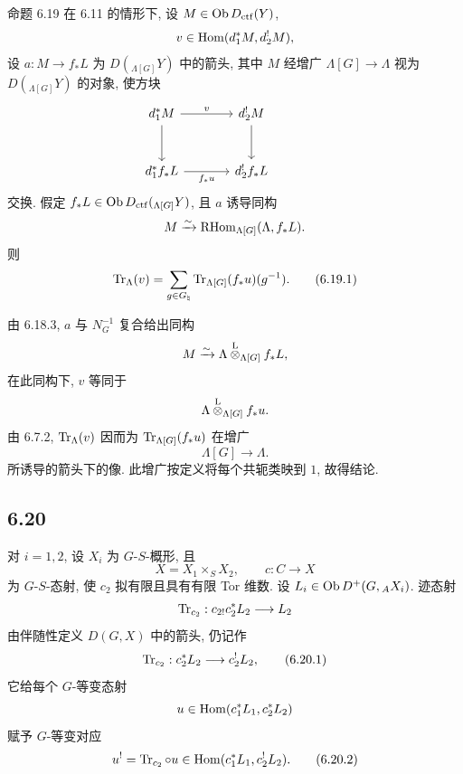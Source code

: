 \begin{statement}{命题 6.19}
在 6.11 的情形下, 设 $M\in\operatorname{Ob} D_{\mathrm{ctf}}(Y)$,
\[
v\in\operatorname{Hom}(d_1^*M,d_2^!M),
\]
设 $a:M\to f_*L$ 为 $D({}_{\Lambda[G]}Y)$ 中的箭头, 其中 $M$ 经增广 $\Lambda[G]\to\Lambda$ 视为 $D({}_{\Lambda[G]}Y)$ 的对象, 使方块
\[
\begin{tikzcd}[column sep=large,row sep=large]
d_1^*M \arrow[r,"v"] \arrow[d] & d_2^!M \arrow[d] & {}\\
d_1^*f_*L \arrow[r,"f_*u"'] & d_2^!f_*L
\end{tikzcd}
\]
交换. 假定 $f_*L\in\operatorname{Ob} D_{\mathrm{ctf}}({}_{\Lambda[G]}Y)$, 且 $a$ 诱导同构
\[
M\xrightarrow{\sim}\mathrm{RHom}_{\Lambda[G]}(\Lambda,f_*L).
\]
则
\begin{equation}
\operatorname{Tr}_{\Lambda}(v)=
\sum_{g\in G_{\natural}}\operatorname{Tr}_{\Lambda[G]}(f_*u)(g^{-1}).
\tag{6.19.1}
\end{equation}
\end{statement}

由 6.18.3, $a$ 与 $N_G^{-1}$ 复合给出同构
\[
M\xrightarrow{\sim}\Lambda\overset{\mathrm L}{\otimes}_{\Lambda[G]}f_*L,
\]
在此同构下, $v$ 等同于
\[
\Lambda\overset{\mathrm L}{\otimes}_{\Lambda[G]}f_*u.
\]
由 6.7.2, $\operatorname{Tr}_{\Lambda}(v)$ 因而为 $\operatorname{Tr}_{\Lambda[G]}(f_*u)$ 在增广
\[
\Lambda[G]\longrightarrow \Lambda.
\]
所诱导的箭头下的像. 此增广按定义将每个共轭类映到 $1$, 故得结论.

\subsection*{6.20}
对 $i=1,2$, 设 $X_i$ 为 $G$-$S$-概形, 且
\[
X=X_1\times_SX_2,\qquad c:C\to X
\]
为 $G$-$S$-态射, 使 $c_2$ 拟有限且具有有限 Tor 维数. 设 $L_i\in\operatorname{Ob} D^+(G,{}_AX_i)$. 迹态射
\[
\operatorname{Tr}_{c_2}:c_{2!}c_2^*L_2\longrightarrow L_2
\]
由伴随性定义 $D(G,X)$ 中的箭头, 仍记作
\begin{equation}
\operatorname{Tr}_{c_2}:c_2^*L_2\longrightarrow c_2^!L_2,
\tag{6.20.1}
\end{equation}
它给每个 $G$-等变态射
\[
u\in\operatorname{Hom}(c_1^*L_1,c_2^*L_2)
\]
赋予 $G$-等变对应
\begin{equation}
u^! = \operatorname{Tr}_{c_2}\circ u\in\operatorname{Hom}(c_1^*L_1,c_2^!L_2).
\tag{6.20.2}
\end{equation}

